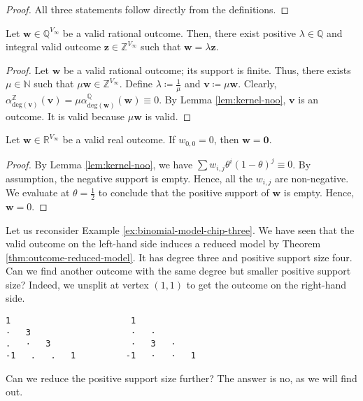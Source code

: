 \begin{proof}
    All three statements follow directly from the definitions.
\end{proof}

\begin{proposition}\label{prop:outcome-rational-fluf}
    Let \( \mathbf{w} \in \mathbb{Q}^{V_\infty} \) be a valid rational outcome. Then, there exist positive \( \lambda \in \mathbb{Q} \) and integral valid outcome \( \mathbf{z} \in \mathbb{Z}^{V_\infty} \) such that \( \mathbf{w} = \lambda \mathbf{z} \).
\end{proposition}

\begin{proof}
    Let \( \mathbf{w} \) be a valid rational outcome; its support is finite. Thus, there exists \( \mu \in \mathbb{N} \) such that \( \mu \mathbf w \in \mathbb{Z}^{V_\infty} \). Define \( \lambda \coloneqq \frac{1}{\mu} \) and \( \mathbf{v} \coloneqq \mu \mathbf{w} \). Clearly, \( \alpha^{\mathbb{Z}}_{\mathrm{deg}(\mathbf v)}(\mathbf v) = \mu \alpha^{\mathbb{Q}}_{\mathrm{deg}(\mathbf w)}(\mathbf w) \equiv 0 \). By Lemma \ref{lem:kernel-noo}, \( \mathbf v \) is an outcome. It is valid because \( \mu \mathbf w \) is valid.
\end{proof}

\begin{proposition}\label{prop:outcome-zero}
    Let \( \mathbf{w} \in \mathbb{R}^{V_\infty} \) be a valid real outcome. If \( w_{0,0} = 0 \), then \( \mathbf{w} = \mathbf 0 \).
\end{proposition}

\begin{proof}
    By Lemma \ref{lem:kernel-noo}, we have \( \sum w_{i,j}\theta^i (1-\theta)^j \equiv 0 \). By assumption, the negative support is empty. Hence, all the \( w_{i,j} \) are non-negative. We evaluate at \( \theta = \frac{1}{2} \) to conclude that the positive support of \( \mathbf w \) is empty. Hence, \( \mathbf w = 0 \).
\end{proof}

\begin{example}
    Let us reconsider Example \ref{ex:binomial-model-chip-three}.
   We have seen that the valid outcome on the left-hand side induces a reduced model by Theorem \ref{thm:outcome-reduced-model}. It has degree three and positive support size four. Can we find another outcome with the same degree but smaller positive support size? Indeed, we unsplit at vertex \( (1,1) \) to get the outcome on the right-hand side.
   \begin{verbatim}
1                        1
·   3                    ·   ·
.   ·   3                ·   3   ·    
-1   .   .   1          -1   ·   ·   1 
    \end{verbatim}
    Can we reduce the positive support size further? The answer is no, as we will find out.
\end{example}

